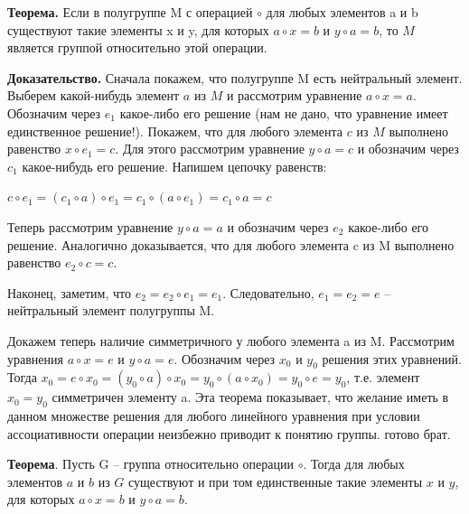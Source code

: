 \documentclass[a4paper]{article}
\begin{document}
\begin{htheorem}
\textbf{Теорема.} Если в полугруппе M с операцией $\circ$ для любых элементов a и b
существуют такие элементы x и y, для которых $a \circ x = b$ и $y \circ a  = b$, то $M$ является группой относительно этой операции.
\end{htheorem}


\begin{hproof}
\textbf{Доказательство.} Сначала покажем, что полугруппе M есть нейтральный
элемент. Выберем какой-нибудь элемент $a$ из $M$ и рассмотрим уравнение $a \circ x = a$. Обозначим через $e_1$ какое-либо его решение (нам не дано, что уравнение
имеет единственное решение!). Покажем, что для любого элемента $c$ из $M$
выполнено равенство $x \circ e_1 = c$.  Для этого рассмотрим уравнение $y \circ a  = c$ и обозначим через $c_1$ какое-нибудь его решение. Напишем цепочку равенств:

$c \circ e_1 = (c_1 \circ a ) \circ e_1 = c_1 \circ ( a \circ e_1) = c_1 \circ a = c$

Теперь рассмотрим уравнение $y \circ a = a$ и обозначим через $e_2$ какое-либо его
решение. Аналогично доказывается, что для любого элемента c из M
выполнено равенство $e_2 \circ c = c$.

Наконец, заметим, что $e_2 = e_2 \circ e_1 = e_1$. Следовательно, $e_1 = e_2 = e$ –
нейтральный элемент полугруппы M.

Докажем теперь наличие симметричного у любого элемента a из M.
Рассмотрим уравнения $a \circ x = e$ и $y \circ a = e$. Обозначим через $x_0$ и $y_0$ решения
этих уравнений. Тогда $x_0 = e \circ x_0 = (y_0 \circ a) \circ x_0 = y_0 \circ (a \circ x_0) = y_0 \circ e = y_0$, т.е.
элемент $x_0 = y_0$ симметричен элементу a.
Эта теорема показывает, что желание иметь в данном множестве решения
для любого линейного уравнения при условии ассоциативности операции
неизбежно приводит к понятию группы. готово брат.
\end{hproof}

\begin{htheorem}
\textbf{Теорема}. Пусть G – группа относительно операции $\circ$. Тогда для любых
элементов $a$ и $b$ из $G$ существуют и при том единственные такие элементы $x$ и $y$,
для которых $a 
\circ x = b$ и $y \circ a = b.$
\end{htheorem}
\end{document}
